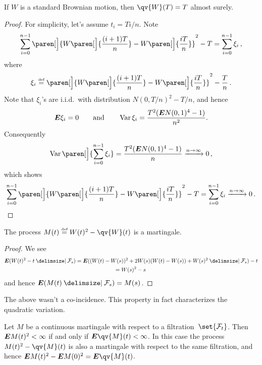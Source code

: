 \begin{proposition}
  If $W$ is a standard Brownian motion, then $\qv{W}(T) = T$ almost surely.
\end{proposition}
\begin{proof}
  For simplicity, let's assume $t_i = Ti/n$.
  Note
  \begin{equation*}
    \sum_{i=0}^{n-1}
      \paren[\Big]{
	W\paren[\Big]{\frac{(i+1)T}{n}}
	- W\paren[\Big]{\frac{iT}{n}}
      }^2 - T
      = \sum_{i=0}^{n-1}
	  \xi_i\,,
  \end{equation*}
  where
  \begin{equation*}
    \xi_i \defeq
	    \paren[\Big]{
	      W\paren[\Big]{\frac{(i+1)T}{n}}
	      - W\paren[\Big]{\frac{iT}{n}}
	    }^2 - \frac{T}{n}\,.
  \end{equation*}
  Note that $\xi_i$'s are i.i.d.\ with distribution $N(0, T/n)^2 - T/n$, and hence
  \begin{equation*}
    \bm{E} \xi_i = 0
    \qquad\text{and}\qquad
    \operatorname{Var} \xi_i = \frac{T^2 (\bm{E} N(0,1)^4 - 1)}{n^2}.
  \end{equation*}
  Consequently
  \begin{equation*}
    \var\paren[\Big]{
      \sum_{i=0}^{n-1} \xi_i
    } = \frac{T^2 (\E N(0,1)^4 - 1)}{n} \xrightarrow{n \to \infty} 0\,,
  \end{equation*}
  which shows
  \begin{equation*}
    \sum_{i=0}^{n-1}
      \paren[\Big]{
	W\paren[\Big]{\frac{(i+1)T}{n}}
	- W\paren[\Big]{\frac{iT}{n}}
      }^2 - T
      = \sum_{i=0}^{n-1}
	  \xi_i
      \xrightarrow{n \to \infty} 0 \,.
      \qedhere
  \end{equation*}
\end{proof}

\begin{corollary}
  The process $M(t) \defeq W(t)^2 - \qv{W}(t)$ is a martingale.
\end{corollary}
\begin{proof}
  We see
  \begin{multline*}
    \E( W(t)^2 - t \given \mathcal F_s )
      = \E ( (W(t) - W(s))^2  + 2 W(s) (W(t) - W(s)) + W(s)^2 \given \mathcal F_s ) - t
      \\
      = W(s)^2 - s\,
  \end{multline*}
  and hence $\E (M(t) \given \mathcal F_s ) = M(s)$.
\end{proof}

The above wasn't a co-incidence.
This property in fact characterizes the quadratic variation.
\begin{theorem}\label{t:qv1}
  Let $M$ be a continuous martingale with respect to a filtration~$\set{\mathcal F_t}$.
  Then $\bm{E} M(t)^2 < \infty$ if and only if $\E \qv{M}(t) < \infty$.
  In this case the process $M(t)^2 - \qv{M}(t)$ is also a martingale with respect to the same filtration, and hence $\E M(t)^2 - \E M(0)^2 = \E \qv{M}(t)$.
\end{theorem}

